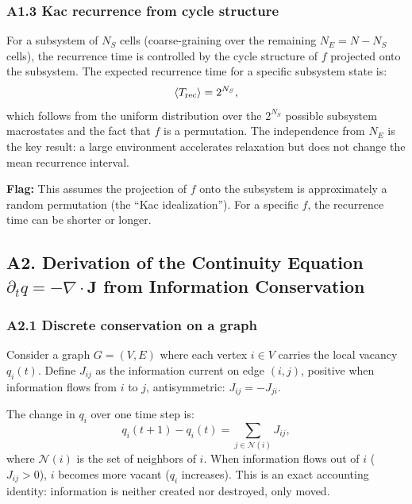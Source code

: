 \documentclass[reprint]{revtex4-2}
\begin{document}
\subsubsection{A1.3 Kac recurrence from cycle structure}

For a subsystem of $N_S$ cells (coarse-graining over the remaining $N_E=N-N_S$ cells), the recurrence time is controlled by the cycle structure of $f$ projected onto the subsystem. The expected recurrence time for a specific subsystem state is:
\begin{equation}
\langle T_{\rm rec}\rangle = 2^{N_S},
\end{equation}
which follows from the uniform distribution over the $2^{N_S}$ possible subsystem macrostates and the fact that $f$ is a permutation. The independence from $N_E$ is the key result: a large environment accelerates relaxation but does not change the mean recurrence interval.

\textbf{Flag:} This assumes the projection of $f$ onto the subsystem is approximately a random permutation (the ``Kac idealization''). For a specific $f$, the recurrence time can be shorter or longer.

\subsection{A2. Derivation of the Continuity Equation $\partial_t q = -\nabla\cdot\mathbf{J}$ from Information Conservation}

\subsubsection{A2.1 Discrete conservation on a graph}

Consider a graph $G=(V,E)$ where each vertex $i\in V$ carries the local vacancy $q_i(t)$. Define $J_{ij}$ as the information current on edge $(i,j)$, positive when information flows from $i$ to $j$, antisymmetric: $J_{ij} = -J_{ji}$.

The change in $q_i$ over one time step is:
\begin{equation}
q_i(t+1) - q_i(t) = \sum_{j\in\mathcal{N}(i)} J_{ij},
\label{eq:discrete_continuity}
\end{equation}
where $\mathcal{N}(i)$ is the set of neighbors of $i$. When information flows out of $i$ ($J_{ij}>0$), $i$ becomes more vacant ($q_i$ increases). This is an exact accounting identity: information is neither created nor destroyed, only moved.
\end{document}
